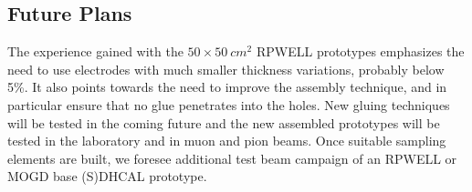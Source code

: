 \subsection{Future Plans}
The experience gained with the $\SI{50} \times \SI{50}{cm^2}$ RPWELL prototypes emphasizes the need to use electrodes with much smaller thickness variations, probably below 5\%. It also points towards the need to improve the assembly technique, and in particular ensure that no glue penetrates into the holes. New gluing techniques will be tested in the coming future and the new assembled prototypes will be tested in the laboratory and in muon and pion beams. 
Once suitable sampling elements are built, we foresee additional test beam campaign of an RPWELL or MOGD base (S)DHCAL prototype. 
